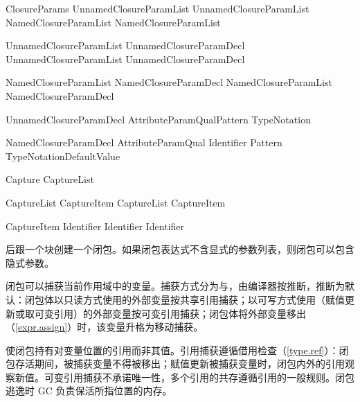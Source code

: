 \begin{bnf}{ClosureParams}
    UnnamedClosureParamList \br
    UnnamedClosureParamList \terminal{,} NamedClosureParamList \br
    NamedClosureParamList
\end{bnf}

\begin{bnf}{UnnamedClosureParamList}
    UnnamedClosureParamDecl \br
    UnnamedClosureParamList \terminal{,} UnnamedClosureParamDecl
\end{bnf}

\begin{bnf}{NamedClosureParamList}
    NamedClosureParamDecl \br
    NamedClosureParamList \terminal{,} NamedClosureParamDecl
\end{bnf}

\begin{bnf}{UnnamedClosureParamDecl}
    Attribute\bnfs ParamQual\bnfq Pattern TypeNotation\bnfq
\end{bnf}

\begin{bnf}{NamedClosureParamDecl}
    Attribute\bnfs ParamQual\bnfs \terminal{(} Identifier \terminal{)} Pattern TypeNotation\bnfq DefaultValue\bnfq
\end{bnf}

\begin{bnf}{Capture}
    \terminal{[} CaptureList\bnfq \terminal{]}
\end{bnf}

\begin{bnf}{CaptureList}
    CaptureItem \br
    CaptureList \terminal{,} CaptureItem
\end{bnf}

\begin{bnf}{CaptureItem}
     \br
    \terminal{\&}  \br
    \terminal{\&}   \br
    Identifier \br
    \terminal{\&} Identifier \br
    \terminal{\&}  Identifier
\end{bnf}

\pnum
{}后跟一个块创建一个闭包。如果闭包表达式不含显式的参数列表，则闭包可以包含隐式参数。

\pnum
闭包可以捕获当前作用域中的变量。捕获方式分为与，由编译器按推断，推断为默认：闭包体以只读方式使用的外部变量按共享引用捕获；以可写方式使用（赋值更新或取可变引用）的外部变量按可变引用捕获；闭包体将外部变量移出（\ref{expr.assign}）时，该变量升格为移动捕获。

\pnum
{}使闭包持有对变量位置的引用而非其值。引用捕获遵循借用检查（\ref{type.ref}）：闭包存活期间，被捕获变量不得被移出；赋值更新被捕获变量时，闭包内外的引用观察新值。可变引用捕获不承诺唯一性，多个引用的共存遵循引用的一般规则。闭包逃逸时 GC 负责保活所指位置的内存。


